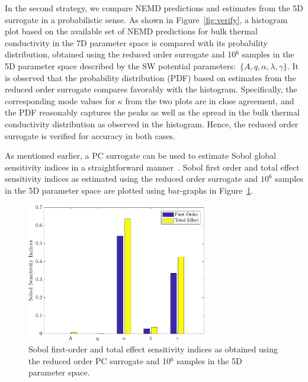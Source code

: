 In the second strategy, we compare NEMD
predictions and estimates from the 5D surrogate in a probabilistic sense. As shown in Figure~\ref{fig:verify}, a 
histogram plot based on the available set of NEMD predictions for bulk thermal conductivity in the 7D parameter 
space is compared with its probability distribution, obtained using the reduced order surrogate and
10$^6$ samples in the 5D parameter space described by the SW potential parameters:~$\{A,q,\alpha,\lambda,\gamma\}$. It is observed that the probability distribution (PDF) based on estimates from the reduced order surrogate compares
favorably with the histogram. Specifically, the corresponding mode values for $\kappa$ from the two plots are
in close agreement, and the PDF reasonably captures the peaks as well as the spread in
the bulk thermal conductivity distribution as observed in the histogram. 
Hence, the reduced order surrogate is verified for accuracy in both cases. 
\bigskip

As mentioned earlier, a PC surrogate can be used to estimate Sobol global sensitivity indices in a 
straightforward manner~\cite{Sudret:2008}. Sobol first order and total effect sensitivity indices as estimated
using the reduced order surrogate and $10^{6}$ samples in the 5D parameter space are plotted using bar-graphs in
Figure~\ref{fig:gsa}. 

\begin{figure}[htbp]
 \begin{center}
  \includegraphics[width=0.70\textwidth]{./Figures/PCE5D_gsa}
\caption{Sobol first-order and total effect sensitivity indices as obtained using the reduced order PC
surrogate and 10$^{6}$ samples in the 5D parameter space. }
\label{fig:gsa}
\end{center}
\end{figure}

